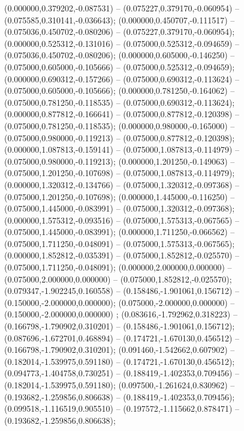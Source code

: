  (0.000000,0.379202,-0.087531) -- (0.075227,0.379170,-0.060954) -- (0.075585,0.310141,-0.036643);
 (0.000000,0.450707,-0.111517) -- (0.075036,0.450702,-0.080206) -- (0.075227,0.379170,-0.060954);
 (0.000000,0.525312,-0.131016) -- (0.075000,0.525312,-0.094659) -- (0.075036,0.450702,-0.080206);
 (0.000000,0.605000,-0.146250) -- (0.075000,0.605000,-0.105666) -- (0.075000,0.525312,-0.094659);
 (0.000000,0.690312,-0.157266) -- (0.075000,0.690312,-0.113624) -- (0.075000,0.605000,-0.105666);
 (0.000000,0.781250,-0.164062) -- (0.075000,0.781250,-0.118535) -- (0.075000,0.690312,-0.113624);
 (0.000000,0.877812,-0.166641) -- (0.075000,0.877812,-0.120398) -- (0.075000,0.781250,-0.118535);
 (0.000000,0.980000,-0.165000) -- (0.075000,0.980000,-0.119213) -- (0.075000,0.877812,-0.120398);
 (0.000000,1.087813,-0.159141) -- (0.075000,1.087813,-0.114979) -- (0.075000,0.980000,-0.119213);
 (0.000000,1.201250,-0.149063) -- (0.075000,1.201250,-0.107698) -- (0.075000,1.087813,-0.114979);
 (0.000000,1.320312,-0.134766) -- (0.075000,1.320312,-0.097368) -- (0.075000,1.201250,-0.107698);
 (0.000000,1.445000,-0.116250) -- (0.075000,1.445000,-0.083991) -- (0.075000,1.320312,-0.097368);
 (0.000000,1.575312,-0.093516) -- (0.075000,1.575313,-0.067565) -- (0.075000,1.445000,-0.083991);
 (0.000000,1.711250,-0.066562) -- (0.075000,1.711250,-0.048091) -- (0.075000,1.575313,-0.067565);
 (0.000000,1.852812,-0.035391) -- (0.075000,1.852812,-0.025570) -- (0.075000,1.711250,-0.048091);
 (0.000000,2.000000,0.000000) -- (0.075000,2.000000,0.000000) -- (0.075000,1.852812,-0.025570);
 (0.079347,-1.902245,0.160558) -- (0.158486,-1.901061,0.156712) -- (0.150000,-2.000000,0.000000);
 (0.075000,-2.000000,0.000000) -- (0.150000,-2.000000,0.000000) ;
 (0.083616,-1.792962,0.318223) -- (0.166798,-1.790902,0.310201) -- (0.158486,-1.901061,0.156712);
 (0.087696,-1.672701,0.468894) -- (0.174721,-1.670130,0.456512) -- (0.166798,-1.790902,0.310201);
 (0.091460,-1.542662,0.607902) -- (0.182014,-1.539975,0.591180) -- (0.174721,-1.670130,0.456512);
 (0.094773,-1.404758,0.730251) -- (0.188419,-1.402353,0.709456) -- (0.182014,-1.539975,0.591180);
 (0.097500,-1.261624,0.830962) -- (0.193682,-1.259856,0.806638) -- (0.188419,-1.402353,0.709456);
 (0.099518,-1.116519,0.905510) -- (0.197572,-1.115662,0.878471) -- (0.193682,-1.259856,0.806638);

